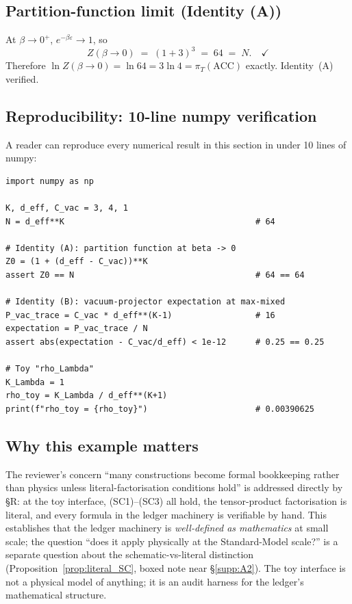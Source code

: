 \documentclass[11pt]{article}
\theoremstyle{plain}
\theoremstyle{definition}
\theoremstyle{remark}
\begin{document}
\bigskip

\subsection{Partition-function limit (Identity (A))}\label{supp:R7}

At $\beta \to 0^+$, $e^{-\beta\varepsilon} \to 1$, so
\[
  Z(\beta \to 0) \;=\; (1 + 3)^3 \;=\; 64 \;=\; N. \quad \checkmark
\]
Therefore $\ln Z(\beta \to 0) = \ln 64 = 3 \ln 4 = \pi_T(\mathrm{ACC})$ exactly.  Identity~(A) verified.

\bigskip

\subsection{Reproducibility: 10-line numpy verification}\label{supp:R8}

A reader can reproduce every numerical result in this section in under 10 lines of numpy:

\begin{verbatim}
import numpy as np

K, d_eff, C_vac = 3, 4, 1
N = d_eff**K                                       # 64

# Identity (A): partition function at beta -> 0
Z0 = (1 + (d_eff - C_vac))**K
assert Z0 == N                                     # 64 == 64

# Identity (B): vacuum-projector expectation at max-mixed
P_vac_trace = C_vac * d_eff**(K-1)                 # 16
expectation = P_vac_trace / N
assert abs(expectation - C_vac/d_eff) < 1e-12      # 0.25 == 0.25

# Toy "rho_Lambda"
K_Lambda = 1
rho_toy = K_Lambda / d_eff**(K+1)
print(f"rho_toy = {rho_toy}")                      # 0.00390625
\end{verbatim}

\bigskip

\subsection{Why this example matters}\label{supp:R9}

The reviewer's concern ``many constructions become formal bookkeeping rather than physics unless literal-factorisation conditions hold'' is addressed directly by §R: at the toy interface, (SC1)--(SC3) all hold, the tensor-product factorisation is literal, and every formula in the ledger machinery is verifiable by hand.  This establishes that the ledger machinery is \emph{well-defined as mathematics} at small scale; the question ``does it apply physically at the Standard-Model scale?'' is a separate question about the schematic-vs-literal distinction (Proposition~\ref{prop:literal_SC}, boxed note near §\ref{supp:A2}).  The toy interface is not a physical model of anything; it is an audit harness for the ledger's mathematical structure.
\end{document}
